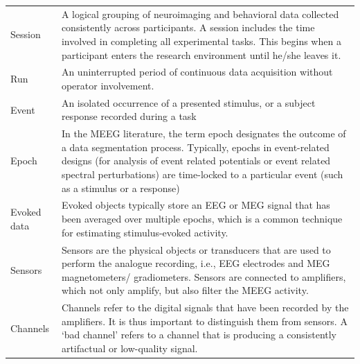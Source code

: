 \begin{table}[ht]

   \centering
   \begin{tabular}{@{}| p{3cm}|p{10cm}| @{}}
      \hline
      Session      & A logical grouping of neuroimaging and behavioral data collected consistently across participants. A session includes the time involved in completing all experimental tasks. This begins when a participant enters the research environment until he/she leaves it.                                                    \\
      Run          & An uninterrupted period of continuous data acquisition without operator involvement.                                                                                                                                                                                                                                     \\
      Event        & An isolated occurrence of a presented stimulus, or a subject response recorded during a task                                                                                                                                                                                                                             \\
      Epoch        & In the MEEG literature, the term epoch designates the outcome of a data segmentation process. Typically, epochs in event-related designs (for analysis of event related potentials or event related spectral perturbations) are time-locked to a particular event (such as a stimulus or a response)                     \\
      Evoked data  & Evoked objects typically store an EEG or MEG signal that has been averaged over multiple epochs, which is a common technique for estimating stimulus-evoked activity.                                                                                                                                                    \\
      Sensors      & Sensors are the physical objects or transducers that are used to perform the analogue recording, i.e., EEG electrodes and MEG magnetometers/ gradiometers. Sensors are connected to amplifiers, which not only amplify, but also filter the MEEG activity.                                                               \\
      Channels     & Channels refer to the digital signals that have been recorded by the amplifiers. It is thus important to distinguish them from sensors. A ‘bad channel’ refers to a channel that is producing a consistently artifactual or low-quality signal.                                                                          \\

\end{tabular}
\end{table}
